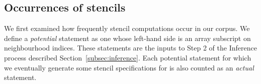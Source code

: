 \documentclass[9pt]{sigplanconf}
\theoremstyle{definition}
\begin{document}





\subsection{Occurrences of stencils}

We first examined how frequently stencil computations occur in our
corpus. We define a \emph{potential} statement as one whose left-hand
side is an array subscript on neighbourhood indices. These statements
are the inputs to Step 2 of the Inference process described
Section~\ref{subsec:inference}. Each potential statement for which we
eventually generate some stencil specifications for is also counted as
an \emph{actual} statement.
\end{document}
